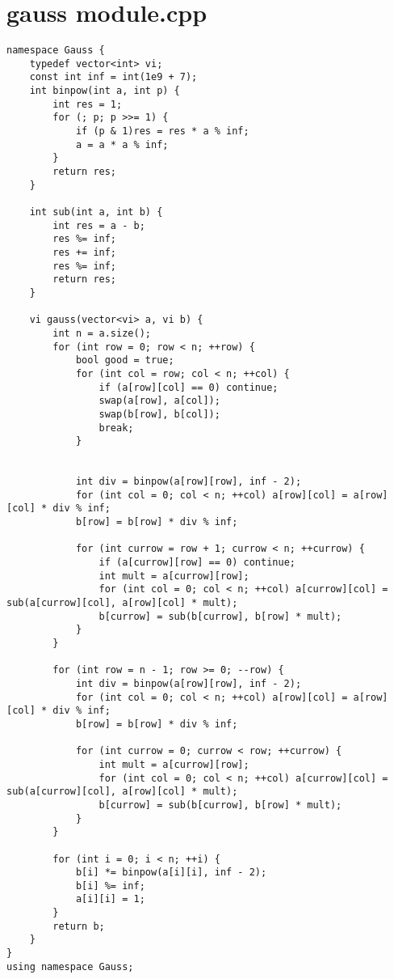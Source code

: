 \documentclass[a4paper,12pt]{report}
\begin{document}
\section{gauss module.cpp}
\begin{lstlisting}
namespace Gauss {
    typedef vector<int> vi;
    const int inf = int(1e9 + 7);
    int binpow(int a, int p) {
        int res = 1;
        for (; p; p >>= 1) {
            if (p & 1)res = res * a % inf;
            a = a * a % inf;
        }
        return res;
    }

    int sub(int a, int b) {
        int res = a - b;
        res %= inf;
        res += inf;
        res %= inf;
        return res;
    }

    vi gauss(vector<vi> a, vi b) {
        int n = a.size();
        for (int row = 0; row < n; ++row) {
            bool good = true;
            for (int col = row; col < n; ++col) {
                if (a[row][col] == 0) continue;
                swap(a[row], a[col]);
                swap(b[row], b[col]);
                break;
            }


            int div = binpow(a[row][row], inf - 2);
            for (int col = 0; col < n; ++col) a[row][col] = a[row][col] * div % inf;
            b[row] = b[row] * div % inf;

            for (int currow = row + 1; currow < n; ++currow) {
                if (a[currow][row] == 0) continue;
                int mult = a[currow][row];
                for (int col = 0; col < n; ++col) a[currow][col] = sub(a[currow][col], a[row][col] * mult);
                b[currow] = sub(b[currow], b[row] * mult);
            }
        }

        for (int row = n - 1; row >= 0; --row) {
            int div = binpow(a[row][row], inf - 2);
            for (int col = 0; col < n; ++col) a[row][col] = a[row][col] * div % inf;
            b[row] = b[row] * div % inf;

            for (int currow = 0; currow < row; ++currow) {
                int mult = a[currow][row];
                for (int col = 0; col < n; ++col) a[currow][col] = sub(a[currow][col], a[row][col] * mult);
                b[currow] = sub(b[currow], b[row] * mult);
            }
        }

        for (int i = 0; i < n; ++i) {
            b[i] *= binpow(a[i][i], inf - 2);
            b[i] %= inf;
            a[i][i] = 1;
        }
        return b;
    }
}
using namespace Gauss;

\end{lstlisting}
\end{document}
